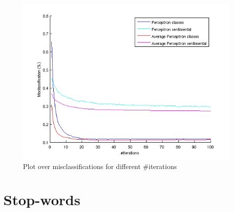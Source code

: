 \begin{figure}[H]
\centering
\includegraphics[scale = 1]{../Plottar/perceptron_2000words_unigram_10foldcv_classes-high_sentimental-low.png}
\caption{Plot over misclassifications for different \#iterations}
\end{figure} 

\chapter{Stop-words}

